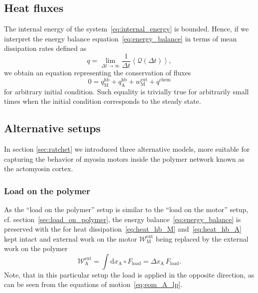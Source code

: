 \documentclass[aps,pre,twocolumn,showpacs,showkeys,superscriptaddress,floatfix]{revtex4-1}
\newcommand{\rmd}{{\mathrm d}}
\begin{document}
\subsection{Heat fluxes}
\label{sec:heat_flux}
The internal energy of the system~\eqref{eq:internal_energy} is bounded.
Hence, if we interpret the energy balance equation~\eqref{eq:energy_balance} in terms of mean dissipation rates defined as 
\begin{equation}
q = \lim_{\Delta t \to \infty} \frac{1}{\Delta t} \left\langle {\mathcal Q}(\Delta t) \right\rangle ,
\label{eq:heat_flux}
\end{equation}
we obtain an equation representing the conservation of fluxes 
\begin{equation}
0 = q_\text{M}^\text{hb} + q_\text{A}^\text{hb} + w^\text{ext}_\text{M} + q^\text{chem} 
\label{eq:heat_flux_balance}
\end{equation}
for arbitrary initial condition. 
Such equality is trivially true for arbitrarily small times when the initial condition corresponds to the steady state.


\subsection{Alternative setups} 
In section \ref{sec:ratchet} we introduced three alternative models, 
more suitable for capturing the behavior of myosin motors inside the polymer network known as the actomyosin cortex.

\subsubsection{Load on the polymer}
As the ``load on the polymer'' setup is similar to the ``load on the motor'' setup, cf. section~\ref{sec:load_on_polymer}, 
the energy balance~\eqref{eq:energy_balance} is preserved 
with the for heat dissipation~\eqref{eq:heat_hb_M} and~\eqref{eq:heat_hb_A} kept intact 
and external work on the motor ${\mathcal W}_\text{M}^\text{ext}$ being replaced by the external work on the polymer
\[
{\mathcal W}_\text{A}^\text{ext} = \int \rmd x_\text{A} \circ F_\text{load} = \Delta x_\text{A} \, F_\text{load} . 
\]
Note, that in this particular setup the load is applied in the opposite direction, as can be seen from the equations of motion~\eqref{eq:eom_A_lp}. 
\end{document}
